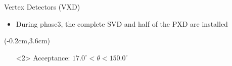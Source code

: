 \documentclass[8pt]{beamer}
\begin{document}
\begin{frame}{Vertex Detectors (VXD)}
\begin{textblock*}{5cm}
\begin{itemize}
				\item<2> During phase3, the complete SVD and half of the PXD are installed

			\end{itemize}
			\end{textblock*}
\begin{textblock*}{11cm}(-0.2cm,3.6cm)
	\begin{center}
		
	\begin{itemize}
	
	\centering
				\item[]<2> Acceptance: $17.0^{\circ} < \theta < 150.0^{\circ}$ 
	\end{itemize}

\end{center}
\end{textblock*}



	
	

	
	
	
\end{frame}
\end{document}
